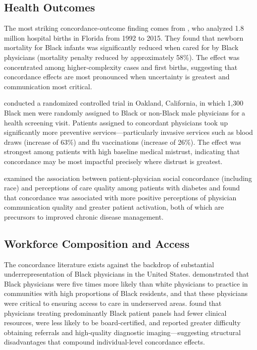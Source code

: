 \documentclass[12pt]{article}
\begin{document}
\subsection{Health Outcomes}

The most striking concordance-outcome finding comes from \citet{greenwood2020}, who analyzed 1.8 million hospital births in Florida from 1992 to 2015. They found that newborn mortality for Black infants was significantly reduced when cared for by Black physicians (mortality penalty reduced by approximately 58\%). The effect was concentrated among higher-complexity cases and first births, suggesting that concordance effects are most pronounced when uncertainty is greatest and communication most critical.

\citet{alsan2019} conducted a randomized controlled trial in Oakland, California, in which 1,300 Black men were randomly assigned to Black or non-Black male physicians for a health screening visit. Patients assigned to concordant physicians took up significantly more preventive services---particularly invasive services such as blood draws (increase of 63\%) and flu vaccinations (increase of 26\%). The effect was strongest among patients with high baseline medical mistrust, indicating that concordance may be most impactful precisely where distrust is greatest.

\citet{thornton2011} examined the association between patient-physician social concordance (including race) and perceptions of care quality among patients with diabetes and found that concordance was associated with more positive perceptions of physician communication quality and greater patient activation, both of which are precursors to improved chronic disease management.

\subsection{Workforce Composition and Access}

The concordance literature exists against the backdrop of substantial underrepresentation of Black physicians in the United States. \citet{komaromy1996} demonstrated that Black physicians were five times more likely than white physicians to practice in communities with high proportions of Black residents, and that these physicians were critical to ensuring access to care in underserved areas. \citet{bach2004} found that physicians treating predominantly Black patient panels had fewer clinical resources, were less likely to be board-certified, and reported greater difficulty obtaining referrals and high-quality diagnostic imaging---suggesting structural disadvantages that compound individual-level concordance effects.
\end{document}
